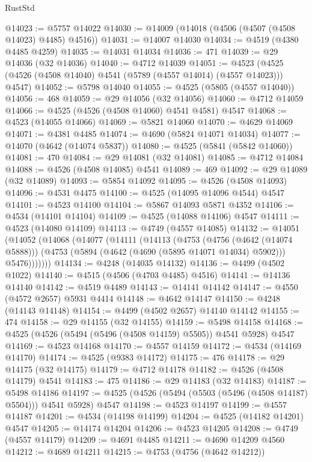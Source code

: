 \begin{lexlean}{RustStd}
\begin{coremodule}
@14023 := @5757 @14022
@14030 := @14009 (@14018 (@4506 (@4507 (@4508 @14023) @4485) @4516))
@14031 := @14007 @14030
@14034 := @4519 (@4380 @4485 @4259)
@14035 := @14031 @14034
@14036 := 471
@14039 := @29 @14036 (@32 @14036)
@14040 := @4712 @14039
@14051 := @4523 (@4525 (@4526 (@4508 @14040) @4541 (@5789 (@4557 @14014) (@4557 @14023))) @4547)
@14052 := @5798 @14040
@14055 := @4525 (@5805 (@4557 @14040))
@14056 := 468
@14059 := @29 @14056 (@32 @14056)
@14060 := @4712 @14059
@14066 := @4525 (@4526 (@4508 @14060) @4541 @4581) @4547
@14068 := @4523 (@14055 @14066)
@14069 := @5821 @14060
@14070 := @4629 @14069
@14071 := @4381 @4485
@14074 := @4690 (@5824 @14071 @14034)
@14077 := @14070 (@4642 (@14074 @5837))
@14080 := @4525 (@5841 (@5842 @14060))
@14081 := 470
@14084 := @29 @14081 (@32 @14081)
@14085 := @4712 @14084
@14088 := @4526 (@4508 @14085) @4541
@14089 := 469
@14092 := @29 @14089 (@32 @14089)
@14093 := @5854 @14092
@14095 := @4526 (@4508 @14093)
@14096 := @4531 @4475
@14100 := @4525 (@14095 @14096 @4544) @4547
@14101 := @4523 @14100
@14104 := @5867 @14093 @5871 @4352
@14106 := @4534 (@14101 @14104)
@14109 := @4525 (@14088 @14106) @4547
@14111 := @4523 (@14080 @14109)
@14113 := @4749 (@4557 @14085)
@14132 := @14051
    (@14052
      (@14068
        (@14077
          (@14111
            (@14113
              (@4753
                (@4756 (@4642 (@14074 @5888)))
                (@4753 (@5894 (@4642 (@4690 (@5895 @14071 @14034) @5902))) @5476)))))))
@14134 := @4248 (@14035 @14132)
@14136 := @4499 (@4502 @1022)
@14140 := @4515 (@4506 (@4703 @4485) @4516)
@14141 := @14136 @14140
@14142 := @4519 @4489
@14143 := @14141 @14142
@14147 := @4550 (@4572 @2657) @5931 @4414
@14148 := @4642 @14147
@14150 := @4248 (@14143 @14148)
@14154 := @4499 (@4502 @2657) @14140 @14142
@14155 := 474
@14158 := @29 @14155 (@32 @14155)
@14159 := @5498 @14158
@14168 := @4525 (@4526 (@5494 (@5496 (@4508 @14159) @5505)) @4541 @5928) @4547
@14169 := @4523 @14168
@14170 := @4557 @14159
@14172 := @4534 (@14169 @14170)
@14174 := @4525 (@9383 @14172)
@14175 := 476
@14178 := @29 @14175 (@32 @14175)
@14179 := @4712 @14178
@14182 := @4526 (@4508 @14179) @4541
@14183 := 475
@14186 := @29 @14183 (@32 @14183)
@14187 := @5498 @14186
@14197 := @4525 (@4526 (@5494 (@5503 (@5496 (@4508 @14187) @5504))) @4541 @5928) @4547
@14198 := @4523 @14197
@14199 := @4557 @14187
@14201 := @4534 (@14198 @14199)
@14204 := @4525 (@14182 @14201) @4547
@14205 := @14174 @14204
@14206 := @4523 @14205
@14208 := @4749 (@4557 @14179)
@14209 := @4691 @4485
@14211 := @4690 @14209 @4560
@14212 := @4689 @14211
@14215 := @4753 (@4756 (@4642 @14212))

\end{coremodule}
\end{lexlean}
